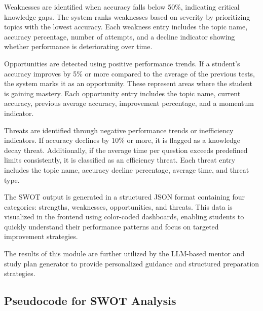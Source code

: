 \begin{sloppypar}
Weaknesses are identified when accuracy falls below 50\%, indicating critical knowledge gaps. The system ranks weaknesses based on severity by prioritizing topics with the lowest accuracy. Each weakness entry includes the topic name, accuracy percentage, number of attempts, and a decline indicator showing whether performance is deteriorating over time.

Opportunities are detected using positive performance trends. If a student's accuracy improves by 5\% or more compared to the average of the previous tests, the system marks it as an opportunity. These represent areas where the student is gaining mastery. Each opportunity entry includes the topic name, current accuracy, previous average accuracy, improvement percentage, and a momentum indicator.

Threats are identified through negative performance trends or inefficiency indicators. If accuracy declines by 10\% or more, it is flagged as a knowledge decay threat. Additionally, if the average time per question exceeds predefined limits consistently, it is classified as an efficiency threat. Each threat entry includes the topic name, accuracy decline percentage, average time, and threat type.

The SWOT output is generated in a structured JSON format containing four categories: strengths, weaknesses, opportunities, and threats. This data is visualized in the frontend using color-coded dashboards, enabling students to quickly understand their performance patterns and focus on targeted improvement strategies.

The results of this module are further utilized by the LLM-based mentor and study plan generator to provide personalized guidance and structured preparation strategies.

\subsection{Pseudocode for SWOT Analysis}


\end{sloppypar}

